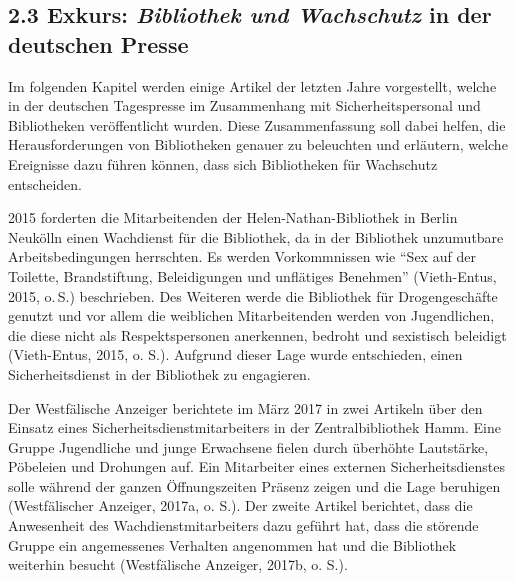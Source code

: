\documentclass[a4paper,
fontsize=11pt,
oneside,
numbers=noperiodatend,
parskip=half-,
bibliography=totoc,
final
]{scrartcl}
\begin{document}
\hypertarget{exkurs-bibliothek-und-wachschutz-in-der-deutschen-presse}{%
\subsection{\texorpdfstring{2.3 Exkurs: \emph{Bibliothek und Wachschutz}
in der deutschen
Presse}{2.3 Exkurs: Bibliothek und Wachschutz in der deutschen Presse}}\label{exkurs-bibliothek-und-wachschutz-in-der-deutschen-presse}}

Im folgenden Kapitel werden einige Artikel der letzten Jahre
vorgestellt, welche in der deutschen Tagespresse im Zusammenhang mit
Sicherheitspersonal und Bibliotheken veröffentlicht wurden. Diese
Zusammenfassung soll dabei helfen, die Herausforderungen von
Bibliotheken genauer zu beleuchten und erläutern, welche Ereignisse dazu
führen können, dass sich Bibliotheken für Wachschutz entscheiden.

2015 forderten die Mitarbeitenden der Helen-Nathan-Bibliothek in Berlin
Neukölln einen Wachdienst für die Bibliothek, da in der Bibliothek
unzumutbare Arbeitsbedingungen herrschten. Es werden Vorkommnissen wie
\enquote{Sex auf der Toilette, Brandstiftung, Beleidigungen und
unflätiges Benehmen} (Vieth-Entus, 2015, o.\,S.) beschrieben. Des
Weiteren werde die Bibliothek für Drogengeschäfte genutzt und vor allem
die weiblichen Mitarbeitenden werden von Jugendlichen, die diese nicht
als Respektspersonen anerkennen, bedroht und sexistisch beleidigt
(Vieth-Entus, 2015, o. S.). Aufgrund dieser Lage wurde entschieden,
einen Sicherheitsdienst in der Bibliothek zu engagieren.

Der Westfälische Anzeiger berichtete im März 2017 in zwei Artikeln über
den Einsatz eines Sicherheitsdienstmitarbeiters in der Zentralbibliothek
Hamm. Eine Gruppe Jugendliche und junge Erwachsene fielen durch
überhöhte Lautstärke, Pöbeleien und Drohungen auf. Ein Mitarbeiter eines
externen Sicherheitsdienstes solle während der ganzen Öffnungszeiten
Präsenz zeigen und die Lage beruhigen (Westfälischer Anzeiger, 2017a, o.
S.). Der zweite Artikel berichtet, dass die Anwesenheit des
Wachdienstmitarbeiters dazu geführt hat, dass die störende Gruppe ein
angemessenes Verhalten angenommen hat und die Bibliothek weiterhin
besucht (Westfälische Anzeiger, 2017b, o. S.).
\end{document}
